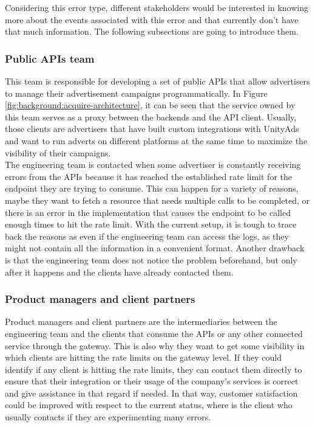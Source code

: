 \documentclass[english, 12pt, a4paper, sci, utf8, a-1b, online]{aaltothesis}
\begin{document}
Considering this error type, different stakeholders would be interested in knowing more about the events associated with this error and that currently don't have that much information. The following subsections are going to introduce them.

\subsubsection*{Public APIs team}

This team is responsible for developing a set of public APIs that allow advertisers to manage their advertisement campaigns programmatically. In Figure \ref{fig:background:acquire-architecture}, it can be seen that the service owned by this team serves as a proxy between the backends and the API client. Usually, those clients are advertisers that have built custom integrations with UnityAds and want to run adverts on different platforms at the same time to maximize the visibility of their campaigns.\\

The engineering team is contacted when some advertiser is constantly receiving errors from the APIs because it has reached the established rate limit for the endpoint they are trying to consume. This can happen for a variety of reasons, maybe they want to fetch a resource that needs multiple calls to be completed, or there is an error in the implementation that causes the endpoint to be called enough times to hit the rate limit. With the current setup, it is tough to trace back the reasons as even if the engineering team can access the logs, as they might not contain all the information in a convenient format. Another drawback is that the engineering team does not notice the problem beforehand, but only after it happens and the clients have already contacted them.

\subsubsection*{Product managers and client partners}

Product managers and client partners are the intermediaries between the engineering team and the clients that consume the APIs or any other connected service through the gateway. This is also why they want to get some visibility in which clients are hitting the rate limits on the gateway level. If they could identify if any client is hitting the rate limits, they can contact them directly to ensure that their integration or their usage of the company's services is correct and give assistance in that regard if needed. In that way, customer satisfaction could be improved with respect to the current status, where is the client who usually contacts if they are experimenting many errors.\\
\end{document}
